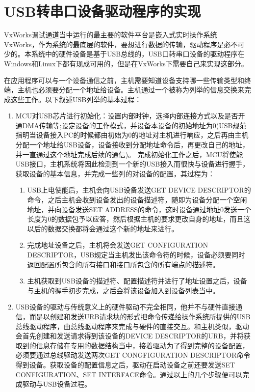 \section{USB转串口设备驱动程序的实现}
	VxWorks调试通道当中运行的最主要的软件平台是嵌入式实时操作系统VxWorks，作为系统的最底层的软件，要想进行数据的传输，驱动程序是必不可少的。本系统中的硬件设备是基于USB总线的，USB口转串口设备的驱动程序在Windows和Linux下都有现成可用的，但是在VxWorks下需要自己来实现这部分。
	
	
	
	在应用程序可以与一个设备通信之前，主机需要知道设备支持哪一些传输类型和终端，主机也必须要分配一个地址给设备。主机通过一个被称为列举的信息交换来完成这些工作。以下叙述USB列举的基本过程：
\begin{enumerate}
\item {}

	MCU对USB芯片进行初始化：设置内部时钟，选择内部连接方式以及是否开通DMA传输等;设定设备的工作模式，并设备本设备的初始地址为0(USB规范指明当设备接入PC的时候都由初始为0的地址对主机进行响应，之后再由主机分配一个地址给USB设备，设备接收到分配地址命令后，再更改自己的地址，并一直通过这个地址完成后续的通信)。
	完成初始化工作之后，MCU将使能USB接口，主机系统将因此检测到一个新的USB接入而很快与设备进行握手，获取设备的基本信息，并完成一些列的对设备的配置，其过程为：
	\begin{enumerate}
	\item USB上电使能后，主机会向USB设备发送GET DEVICE DESCRIPTOR的命令，之后主机会收到设备发出的设备描述符，随即为设备分配一个空闲地址，并向设备发送SET ADDRESS的命令，这时设备通过地址0发送一个长度为0的数据包予以应答，然后根据主机的要求更改自身的地址，而且这以后的数据交换都将会通过这个新的地址来进行。
	\item 完成地址设备之后，主机将会发送GET CONFIGURATION DESCRIPTOR，USB规定当主机发出该命令符的时候，设备必须要同时返回配置所包含的所有接口和接口所包含的所有端点的描述符。
	\item 主机获取到USB设备的描述符、配置描述符并进行了地址设置之后，设备与主机的握手初步完成，之后会将该设备加入到设备列表当中。
	\end{enumerate}
	
	\item {}
	
USB设备的驱动与传统意义上的硬件驱动不完全相同，他并不与硬件直接通信，而是以创建和发送URB请求块的形式把命令传递给操作系统所提供的USB总线驱动程序，由总线驱动程序来完成与硬件的直接交互。和主机类似，驱动会首先创建和发送请求得到该设备的DEVICE DESCRIPTOR的URB，并将获取到的信息存储在专用的数据结构当中，接着驱动为了得到完整的设备配置，必须要通过总线驱动发送两次GET CONGFIGURATION DESCRIPTOR命令得到设备。获取设备的配置信息之后，驱动在启动设备之前还要发送SET CONFIGURATION、SET INTERFACE命令。通过以上的几个步骤便可以完成驱动与USB设备过程。	
\end{enumerate}

